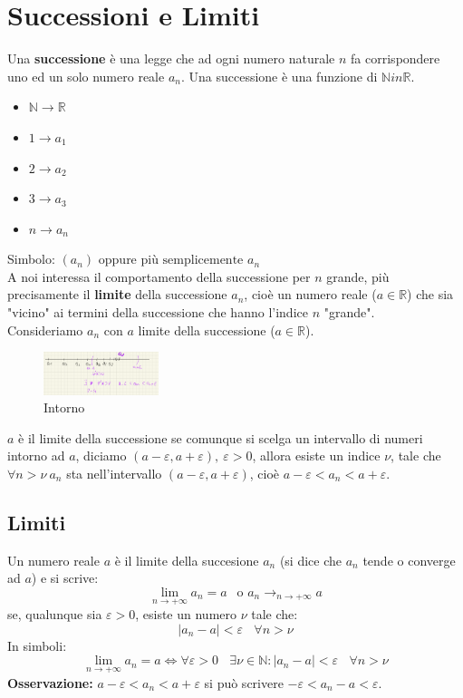 \documentclass{article}
\newcommand{\R}{\mathbb{R}}
\begin{document}
\section{Successioni e Limiti}
Una \textbf{successione} è una legge che ad ogni numero naturale $n$ fa
corrispondere uno ed un solo numero reale $a_n$. Una successione è una funzione
di $\mathbb{N} in \R$.
\begin{itemize}
    \item $\mathbb{N} \to \R$
    \item $1 \to a_1$
    \item $2 \to a_2$
    \item $3 \to a_3$
    \item $n \to a_n$
\end{itemize}
Simbolo: $(a_n) \text{ oppure più semplicemente } a_n$\\
A noi interessa il comportamento della successione per $n$ grande, più precisamente il \textbf{limite} della successione $a_n$, cioè un numero reale ($a \in \R$) che sia "vicino" ai termini della successione che hanno l'indice $n$ "grande".\\
Consideriamo $a_n$ con $a$ limite della successione ($a \in \R$).
\begin{figure}[h!]
    \centering
    \includegraphics[width=0.3\textwidth]{4.png}
    \caption{Intorno}
    \label{fig:4}
\end{figure}
$a$ è il limite della successione se comunque si scelga un intervallo di numeri intorno ad $a$, diciamo $(a-\varepsilon, a+\varepsilon), \ \varepsilon > 0$, allora esiste un indice $\nu$, tale che $\forall n > \nu \ a_n$ sta nell'intervallo $(a-\varepsilon, a+\varepsilon)$, cioè $a-\varepsilon < a_n < a+\varepsilon$.

\subsection{Limiti}
Un numero reale $a$ è il limite della succesione $a_n$ (si dice che $a_n$ tende
o converge ad $a$) e si scrive:
\[
    \lim_{n\to +\infty} a_n = a \ \ \text{ o } a_n \to_{n\to+\infty} a
\]
se, qualunque sia $\varepsilon > 0$, esiste un numero $\nu$ tale che:
\[
    |a_n - a| < \varepsilon \ \ \ \ \forall n > \nu
\]
In simboli:
\[
    \lim_{n\to+\infty}a_n = a \iff \forall \varepsilon > 0 \ \ \ \ \exists \nu \in \mathbb{N} : |a_n - a| < \varepsilon \ \ \ \ \forall n > \nu
\]
\textbf{Osservazione:} $a-\varepsilon < a_n < a+\varepsilon$ si può scrivere $-\varepsilon < a_n - a < \varepsilon$.\\
\end{document}
